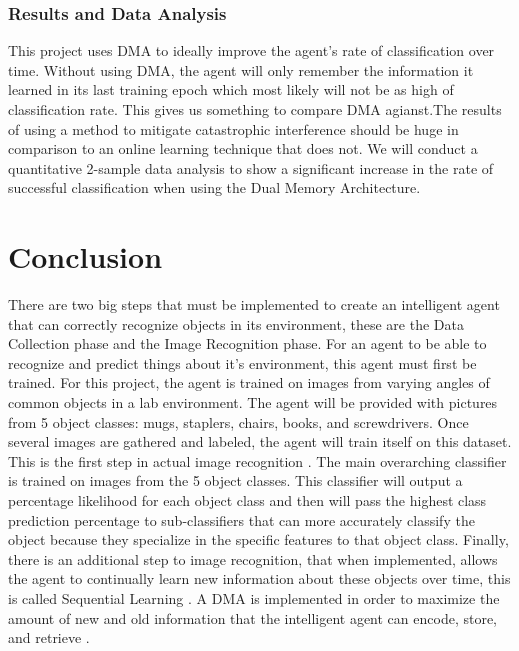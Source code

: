 \documentclass[draftclsnofoot, onecolumn, 10pt, compsoc]{IEEEtran}
\begin{document}
\subsubsection{Results and Data Analysis}
This project uses DMA to ideally improve the agent's rate of classification over time. Without using DMA, the agent will only remember the information it learned in its last training epoch which most likely will not be as high of classification rate. This gives us something to compare DMA agianst.The results of using a method to mitigate catastrophic interference should be huge in comparison to an online learning technique that does not. We will conduct a quantitative 2-sample data analysis to show a significant increase in the rate of successful classification when using the Dual Memory Architecture.

\section{Conclusion}

There are two big steps that must be implemented to create an intelligent agent that can correctly recognize objects in its environment, these are the Data Collection phase and the Image Recognition phase. For an agent to be able to recognize and predict things about it's environment, this agent must first be trained. For this project, the agent is trained on images from varying angles of common objects in a lab environment. The agent will be provided with pictures from 5 object classes: mugs, staplers, chairs, books, and screwdrivers. Once several images are gathered and labeled, the agent will train itself on this dataset. This is the first step in actual image recognition \cite{ImgRecog}. The main overarching classifier is trained on images from the 5 object classes. This classifier will output a percentage likelihood for each object class and then will pass the highest class prediction percentage to sub-classifiers that can more accurately classify the object because they specialize in the specific features to that object class. Finally, there is an additional step to image recognition, that when implemented, allows the agent to continually learn new information about these objects over time, this is called Sequential Learning \cite{Kirkpatrick}. A DMA is implemented in order to maximize the amount of new and old information that the intelligent agent can encode, store, and retrieve \cite{McDermott}.


\end{document}
